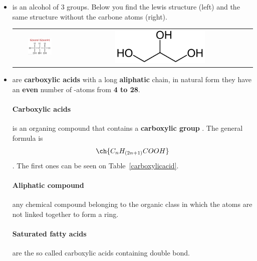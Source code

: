 \documentclass[10pt,a4paper]{article}
\begin{document}
\begin{itemize}
\item[\textbf{\color{violet}{Glycerine}}]is an alcohol of 3  groups. Below you find the lewis structure (left) and the same structure without the carbone atoms (right).

\begin{tabular}{cc}
\includegraphics[width=0.5\textwidth]{Image/glycerine1.png} & \includegraphics[width=0.5\textwidth]{Image/glycerine2.png}
\end{tabular}

\item[\textbf{\color{blue}{Fatty acids}}] are \textbf{carboxylic acids} with a long \textbf{aliphatic} chain, in natural form they have an \textbf{even} number of -atoms from \textbf{4 to 28}.

\paragraph{Carboxylic acids}is an organing compound that contains a \textbf{carboxylic group} . The general formula is $$ \ch{C_n H_{(2n+1)}COOH} $$. The first ones can be seen on Table~\ref{carboxylicacid}. 

\paragraph{Aliphatic compound}any chemical compound belonging to the organic class in which the atoms are not linked together to form a ring.

\paragraph{Saturated fatty acids}are the so called carboxylic acids containing  double bond.


\end{itemize}
\end{document}
